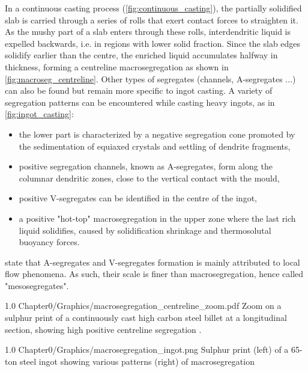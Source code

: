 In a continuous casting process (\cref{fig:continuous_casting}), the partially solidified slab is carried through a series of rolls that exert contact forces to straighten it.
As the mushy part of a slab enters through these rolls, interdendritic liquid is expelled backwards, i.e. in regions with lower solid fraction.
Since the slab edges solidify earlier than the centre, the enriched liquid accumulates halfway in thickness, forming a centreline macrosegregation
as shown in \cref{fig:macroseg_centreline}. Other types of segregates (channels, A-segregates ...) can also be found but remain more specific to ingot casting. 
A variety of segregation patterns can be encountered while casting heavy ingots, as in \cref{fig:ingot_casting}: 
\begin{itemize}
\itemsep0em 
\item the lower part is characterized by a negative segregation cone promoted by the sedimentation of 
	  equiaxed crystals and settling of dendrite fragments,
\item positive segregation channels, known as A-segregates, form along the columnar dendritic zones, close to the vertical contact with the mould,
\item positive V-segregates can be identified in the centre of the ingot,
\item a positive "hot-top" macrosegregation in the upper zone where the last rich liquid solidifies, caused by solidification shrinkage and thermosolutal buoyancy forces. 
\end{itemize}
\citet{combeau_prediction_2009} state that A-segregates and V-segregates formation is mainly attributed to local flow phenomena.
As such, their scale is finer than macrosegregation, hence called "mesosegregates".
\begin{figureth}
{1.0}
{Chapter0/Graphics/macrosegregation_centreline_zoom.pdf}
{Zoom on a sulphur print of a continuously cast high carbon steel billet at a longitudinal section, showing high positive centreline segregation \citep{choudhary_morphology_1994}.}
\label{fig:macroseg_centreline}
\end{figureth}
%
\begin{figureth}
{1.0}
{Chapter0/Graphics/macrosegregation_ingot.png}
{Sulphur print (left) of a 65-ton steel ingot \citep{lesoult_macrosegregation_2005} showing various patterns (right) of macrosegregation \citep{flemings_solidification_1974}}
\label{macrosegregation_ingot}
\end{figureth}
%

